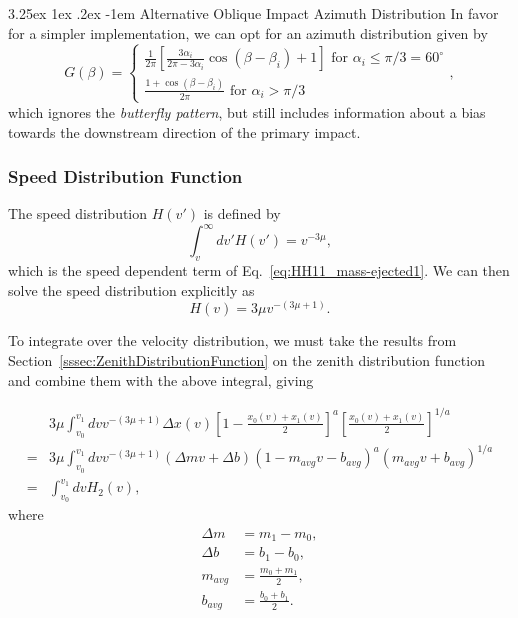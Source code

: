 \documentclass{hitec}
\makeatletter
\numberwithin{equation}{section}
\renewcommand\paragraph{\@startsection{paragraph}{5}{\z@}%
	{3.25ex \@plus1ex \@minus.2ex}%
	{-1em}%
	{\normalfont\normalsize\bfseries}}
\makeatother
\begin{document}
\paragraph{Alternative Oblique Impact Azimuth Distribution}
In favor for a simpler implementation, we can opt for an azimuth distribution given by
\begin{equation}\label{eq:alt-azm-dist_2}
G(\beta) =
\begin{cases}
\frac{1}{2\pi}\left[\frac{3\alpha_i}{2\pi - 3\alpha_i}\cos(\beta-\beta_i)+1\right] \text{  for $\alpha_i\le \pi/3 = 60^\circ$}\\
\frac{1+\cos(\beta-\beta_i)}{2\pi} \text{  for $\alpha_i > \pi/3$}
\end{cases},
\end{equation}
which ignores the \textit{butterfly pattern}, but still includes information about a bias towards the downstream direction of the primary impact.


\subsubsection{Speed Distribution Function}

The speed distribution $H(v')$ is defined by
\begin{equation}
\int_{v}^{\infty}dv'H(v') = v^{-3\mu},
\end{equation}
which is the speed dependent term of Eq.\ \eqref{eq:HH11_mass-ejected1}. We can then solve the speed distribution explicitly as
\begin{equation}\label{eq:vel_dist}
H(v) = 3\mu v^{-(3\mu+1)}.
\end{equation}

To integrate over the velocity distribution, we must take the results from Section~\ref{sssec:ZenithDistributionFunction} on the zenith distribution function and combine them with the above integral, giving

\begin{align}
&3\mu\int_{v_0}^{v_1}dv v^{-(3\mu+1)}\Delta x(v)\left[1-\frac{x_0(v)+x_1(v)}{2}\right]^a \left[\frac{x_0(v)+x_1(v)}{2}\right]^{1/a}\\
=& 3\mu\int_{v_0}^{v_1}dv v^{-(3\mu+1)}(\Delta m v + \Delta b)(1-m_{avg}v-b_{avg})^a(m_{avg}v + b_{avg})^{1/a}\\
=& \int_{v_0}^{v_1}dv H_2(v),\label{eq:def_H2}
\end{align}
where
\begin{align}
\Delta m & = m_1 - m_0,\\
\Delta b &= b_1 - b_0,\\
m_{avg} &= \frac{m_0+m_1}{2},\\
b_{avg} &= \frac{b_0+b_1}{2}.
\end{align}
\end{document}
